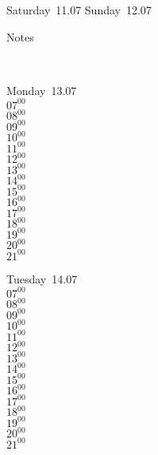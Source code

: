 \documentclass[11pt,a4paper]{book}\usepackage[]{graphicx}\usepackage[]{color}
\begin{document}
{{\begin{tcolorbox}
\end{tcolorbox} 
\begin{tcolorbox}[height=(\textheight-10mm)/6]
Saturday~11.07
\tcblower
Sunday~12.07
\end{tcolorbox} %
\begin{tcolorbox}[height=(\textheight-10mm)/6,sidebyside=false]
Notes
\end{tcolorbox}
\clearpage
\vspace{2 mm}\\
\begin{tcolorbox}
Monday~13.07\\
{ 
  $07^{00}$\\
$08^{00}$\\
$09^{00}$\\
$10^{00}$\\
$11^{00}$\\
$12^{00}$\\
$13^{00}$\\
$14^{00}$\\
$15^{00}$\\
$16^{00}$\\
$17^{00}$\\
$18^{00}$\\
$19^{00}$\\
$20^{00}$\\
$21^{00}$}\\

\end{tcolorbox}
\begin{tcolorbox}
Tuesday~14.07\\
{ 
  $07^{00}$\\
$08^{00}$\\
$09^{00}$\\
$10^{00}$\\
$11^{00}$\\
$12^{00}$\\
$13^{00}$\\
$14^{00}$\\
$15^{00}$\\
$16^{00}$\\
$17^{00}$\\
$18^{00}$\\
$19^{00}$\\
$20^{00}$\\
$21^{00}$}\\


\end{tcolorbox}}}
\end{document}
